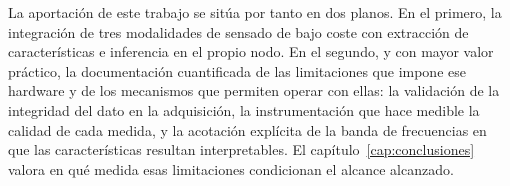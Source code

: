 La aportación de este trabajo se sitúa por tanto en dos planos. En el primero, la integración
de tres modalidades de sensado de bajo coste con extracción de características e inferencia en
el propio nodo. En el segundo, y con mayor valor práctico, la documentación cuantificada de
las limitaciones que impone ese hardware y de los mecanismos que permiten operar con ellas: la
validación de la integridad del dato en la adquisición, la instrumentación que hace medible la
calidad de cada medida, y la acotación explícita de la banda de frecuencias en que las
características resultan interpretables. El capítulo~\ref{cap:conclusiones} valora en qué
medida esas limitaciones condicionan el alcance alcanzado.
